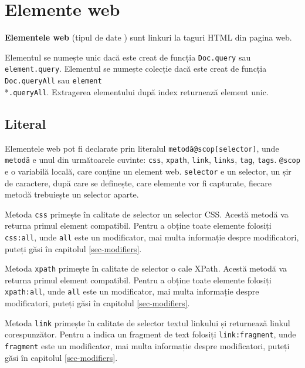 \section{Elemente web}
\label{webelments}

{\bf Elementele web} (tipul de date \element) sunt linkuri la taguri HTML din pagina web.

Elementul se numește unic dacă este creat de funcția \texttt{Doc.query} sau \texttt{element.query}. Elementul se numește colecție dacă este creat de funcția \texttt{Doc.queryAll} sau \texttt{element}\\*\texttt{.queryAll}. Extragerea elementului după index returnează element unic. 

\subsection{Literal}

Elementele web pot fi declarate prin literalul \texttt{metodă@scop[selector]}, unde \texttt{metodă} e unul din următoarele cuvinte: \texttt{css}, \texttt{xpath}, \texttt{link}, \texttt{links}, \texttt{tag}, \texttt{tags}. \texttt{@scop} e o variabilă locală, care conține un element web. \texttt{selector} e un selector, un șir de caractere, după care se definește, care elemente vor fi capturate, fiecare metodă trebuiește un selector aparte.

Metoda \texttt{css} primește în calitate de selector un selector CSS. Acestă metodă va returna primul element compatibil. Pentru a obține toate elemente folosiți \texttt{css:all}, unde \texttt{all} este un modificator, mai multa informație despre modificatori, puteți găsi în capitolul \ref{sec-modifiers}.

Metoda \texttt{xpath} primește în calitate de selector o cale XPath. Acestă metodă va returna primul element compatibil. Pentru a obține toate elemente folosiți \texttt{xpath:all}, unde \texttt{all} este un modificator, mai multa informație despre modificatori, puteți găsi în capitolul \ref{sec-modifiers}.

Metoda \texttt{link} primește în calitate de selector textul linkului și returnează linkul corespunzător. Pentru a indica un fragment de text folosiți \texttt{link:fragment}, unde \texttt{fragment} este un modificator, mai multa informație despre modificatori, puteți găsi în capitolul \ref{sec-modifiers}.

